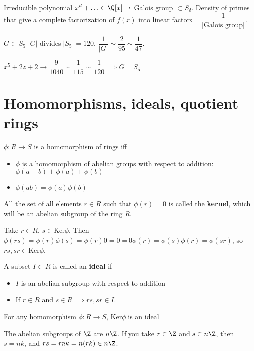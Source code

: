\documentclass[twoside, 10pt]{article}
\newcommand{\Ker}{\text{Ker}}
\begin{document}
Irreducible polynomial $x^d + \ldots \in \Q[x] \to $ Galois group $\subset S_d$. Density of primes that give a complete factorization of $f(x)$ into linear factors$ = \dfrac{1}{|\text{Galois group}|}$.

$G\subset S_5$ $|G|$ divides $|S_5| = 120$. $\dfrac{1}{|G|} \sim \dfrac{2}{95}\sim \dfrac{1}{47}$.

$x^5 + 2z + 2 \to \dfrac{9}{1040} \sim \dfrac{1}{115} \sim \dfrac{1}{120}\implies G = S_5$

\section{Homomorphisms, ideals, quotient rings}
\begin{defn}
    $\phi: R \to S$ is a homomorphism of rings iff \begin{itemize}
        \item $\phi$ is a homomorphism of abelian groups with respect to addition: $\phi(a + b) + \phi(a) + \phi(b)$
        \item $\phi(ab) = \phi(a)\phi(b)$
    \end{itemize}
\end{defn}

\begin{defn}
    All the set of all elements $r\in R$ such that $\phi(r) = 0$ is called the \textbf{kernel}, which will be an abelian subgroup of the ring $R$.
\end{defn}

Take $r\in R$, $s\in \Ker\phi$. Then $\phi(rs) = \phi(r)\phi(s) = \phi(r)0 = 0 = 0\phi(r) = \phi(s)\phi(r) = \phi(sr)$, so $rs, sr \in \Ker\phi$.

\begin{defn}
    A subset $I \subset R$ is called an \textbf{ideal} if \begin{itemize}
        \item $I$ is an abelian subgroup with respect to addition
        \item If $r\in R$ and $s\in R \implies rs, sr \in I$.
    \end{itemize}
\end{defn}

\begin{cor}
    For any homomorphism $\phi: R\to S$, $\Ker\phi$ is an ideal
\end{cor}

\begin{exm*}
    The abelian subgroups of $\Z$ are $n\Z$. If you take $r \in \Z$ and $s \in n\Z$, then $s = nk$, and $rs = rnk = n(rk) \in n\Z$.
\end{exm*}
\end{document}
